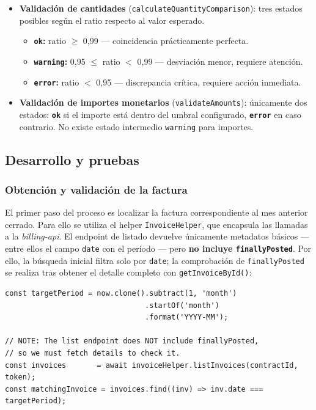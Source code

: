 \begin{itemize}
    \item \textbf{Validación de cantidades} (\texttt{calculateQuantityComparison}): tres estados posibles según el ratio respecto al valor esperado.
    \begin{itemize}
        \item \textbf{\texttt{ok}:} ratio $\geq$ 0,99 --- coincidencia prácticamente perfecta.
        \item \textbf{\texttt{warning}:} 0,95 $\leq$ ratio $<$ 0,99 --- desviación menor, requiere atención.
        \item \textbf{\texttt{error}:} ratio $<$ 0,95 --- discrepancia crítica, requiere acción inmediata.
    \end{itemize}
    \item \textbf{Validación de importes monetarios} (\texttt{validateAmounts}): únicamente dos estados: \textbf{\texttt{ok}} si el importe está dentro del umbral configurado, \textbf{\texttt{error}} en caso contrario. No existe estado intermedio \texttt{warning} para importes.
\end{itemize}

\subsection{Desarrollo y pruebas}

\subsubsection{Obtención y validación de la factura}

El primer paso del proceso es localizar la factura correspondiente al mes anterior cerrado. Para ello se utiliza el helper \texttt{InvoiceHelper}, que encapsula las llamadas a la \textit{billing-api}. El endpoint de listado devuelve únicamente metadatos básicos — entre ellos el campo \texttt{date} con el período — pero \textbf{no incluye \texttt{finallyPosted}}. Por ello, la búsqueda inicial filtra solo por \texttt{date}; la comprobación de \texttt{finallyPosted} se realiza tras obtener el detalle completo con \texttt{getInvoiceById()}:

\begin{lstlisting}[caption=Obtención de la factura del mes anterior cerrado, label=lst:get-invoice]
const targetPeriod = now.clone().subtract(1, 'month')
                                .startOf('month')
                                .format('YYYY-MM');

// NOTE: The list endpoint does NOT include finallyPosted,
// so we must fetch details to check it.
const invoices       = await invoiceHelper.listInvoices(contractId, token);
const matchingInvoice = invoices.find((inv) => inv.date === targetPeriod);
\end{lstlisting}

